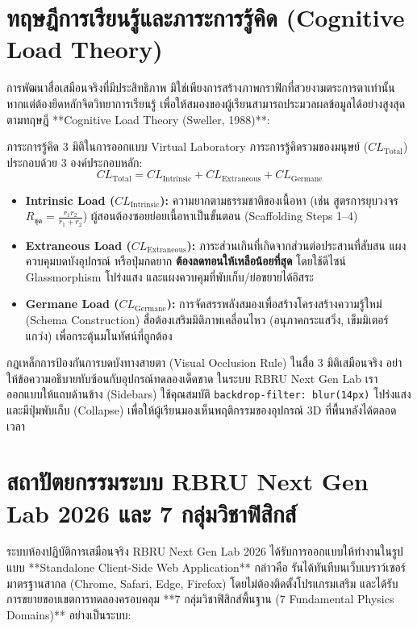 \section{ทฤษฎีการเรียนรู้และภาระการรู้คิด (Cognitive Load Theory)}
การพัฒนาสื่อเสมือนจริงที่มีประสิทธิภาพ มิใช่เพียงการสร้างภาพกราฟิกที่สวยงามตระการตาเท่านั้น หากแต่ต้องยึดหลักจิตวิทยาการเรียนรู้ เพื่อให้สมองของผู้เรียนสามารถประมวลผลข้อมูลได้อย่างสูงสุดตามทฤษฎี **Cognitive Load Theory (Sweller, 1988)**:

\begin{theoremlab}{ภาระการรู้คิด 3 มิติในการออกแบบ Virtual Laboratory}
ภาระการรู้คิดรวมของมนุษย์ ($CL_{\text{Total}}$) ประกอบด้วย 3 องค์ประกอบหลัก:
\begin{equation}
CL_{\text{Total}} = CL_{\text{Intrinsic}} + CL_{\text{Extraneous}} + CL_{\text{Germane}}
\end{equation}
\begin{itemize}[leftmargin=1.5em, itemsep=2pt]
    \item \textbf{Intrinsic Load ($CL_{\text{Intrinsic}}$):} ความยากตามธรรมชาติของเนื้อหา (เช่น สูตรการยุบวงจร $R_{\text{ชุด}} = \frac{r_1 r_2}{r_1+r_2}$) ผู้สอนต้องซอยย่อยเนื้อหาเป็นขั้นตอน (Scaffolding Steps 1--4)
    \item \textbf{Extraneous Load ($CL_{\text{Extraneous}}$):} ภาระส่วนเกินที่เกิดจากส่วนต่อประสานที่สับสน แผงควบคุมบดบังอุปกรณ์ หรือปุ่มกดยาก \textbf{ต้องลดทอนให้เหลือน้อยที่สุด} โดยใช้ดีไซน์ Glassmorphism โปร่งแสง และแผงควบคุมที่พับเก็บ/ย่อขยายได้อิสระ
    \item \textbf{Germane Load ($CL_{\text{Germane}}$):} การจัดสรรพลังสมองเพื่อสร้างโครงสร้างความรู้ใหม่ (Schema Construction) สื่อต้องเสริมมิติภาพเคลื่อนไหว (อนุภาคกระแสวิ่ง, เข็มมิเตอร์แกว่ง) เพื่อกระตุ้นมโนทัศน์ที่ถูกต้อง
\end{itemize}
\end{theoremlab}

\begin{tipbox}{กฎเหล็กการป้องกันการบดบังทางสายตา (Visual Occlusion Rule)}
ในสื่อ 3 มิติเสมือนจริง อย่าให้ข้อความอธิบายทับซ้อนกับอุปกรณ์ทดลองเด็ดขาด ในระบบ RBRU Next Gen Lab เราออกแบบให้แถบด้านข้าง (Sidebars) ใช้คุณสมบัติ \texttt{backdrop-filter: blur(14px)} โปร่งแสง และมีปุ่มพับเก็บ (Collapse) เพื่อให้ผู้เรียนมองเห็นพฤติกรรมของอุปกรณ์ 3D ที่พื้นหลังได้ตลอดเวลา
\end{tipbox}

\section{สถาปัตยกรรมระบบ RBRU Next Gen Lab 2026 และ 7 กลุ่มวิชาฟิสิกส์}
ระบบห้องปฏิบัติการเสมือนจริง RBRU Next Gen Lab 2026 ได้รับการออกแบบให้ทำงานในรูปแบบ **Standalone Client-Side Web Application** กล่าวคือ รันได้ทันทีบนเว็บเบราว์เซอร์มาตรฐานสากล (Chrome, Safari, Edge, Firefox) โดยไม่ต้องติดตั้งโปรแกรมเสริม และได้รับการขยายขอบเขตการทดลองครอบคลุม **7 กลุ่มวิชาฟิสิกส์พื้นฐาน (7 Fundamental Physics Domains)** อย่างเป็นระบบ:

